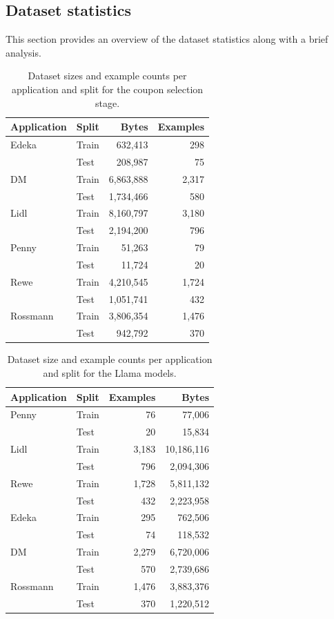 \documentclass[licencjacka,en]{pracamgr}
\begin{document}
\subsection{Dataset statistics}
This section provides an overview of the dataset statistics along with a brief analysis.

\begin{table}[h!]
\centering
\begin{tabular}{|l|l|r|r|}
\hline
\textbf{Application} & \textbf{Split} & \textbf{Bytes} & \textbf{Examples} \\
\hline
Edeka     & Train & 632,413  & 298 \\
          & Test  & 208,987  & 75 \\
DM        & Train & 6,863,888 & 2,317 \\
          & Test  & 1,734,466 & 580 \\
Lidl      & Train & 8,160,797 & 3,180 \\
          & Test  & 2,194,200 & 796 \\
Penny     & Train & 51,263   & 79 \\
          & Test  & 11,724   & 20 \\
Rewe      & Train & 4,210,545 & 1,724 \\
          & Test  & 1,051,741 & 432 \\
Rossmann  & Train & 3,806,354 & 1,476 \\
          & Test  & 942,792  & 370 \\
\hline
\end{tabular}
\caption{Dataset sizes and example counts per application and split for the coupon selection stage.}
\end{table}

\begin{table}[h!]
\centering
\begin{tabular}{|l|l|r|r|}
\hline
\textbf{Application} & \textbf{Split} & \textbf{Examples} & \textbf{Bytes} \\
\hline
Penny     & Train & 76  & 77,006 \\
          & Test  & 20  & 15,834 \\
Lidl      & Train & 3,183 & 10,186,116 \\
          & Test  & 796  & 2,094,306 \\
Rewe      & Train & 1,728 & 5,811,132 \\
          & Test  & 432  & 2,223,958 \\
Edeka     & Train & 295  & 762,506 \\
          & Test  & 74   & 118,532 \\
DM        & Train & 2,279 & 6,720,006 \\
          & Test  & 570  & 2,739,686 \\
Rossmann  & Train & 1,476 & 3,883,376 \\
          & Test  & 370  & 1,220,512 \\
\hline
\end{tabular}
\caption{Dataset size and example counts per application and split for the Llama models.}
\end{table}
\end{document}
